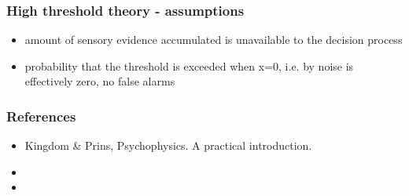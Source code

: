 \documentclass[]{beamer}
\begin{document}
\begin{frame}
 \frametitle{High threshold theory - assumptions}
\begin{itemize}
\item amount of sensory evidence accumulated is unavailable to the decision process
\item probability that the threshold is exceeded when x=0, i.e. by noise is effectively zero, no false alarms
\end{itemize}
\end{frame}



\begin{frame}
 \frametitle{References}
\begin{small}
\begin{itemize}
 \item  Kingdom \& Prins, Psychophysics. A practical introduction. 
 \item 
 \item 
\end{itemize}
\end{small}
\end{frame}
\end{document}
